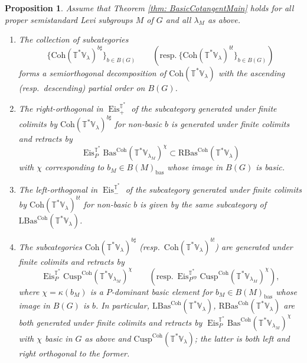 \documentclass{amsart}
\newtheorem{proposition}[theorem]{Proposition}
\theoremstyle{definition}
\theoremstyle{remark}
\numberwithin{equation}{section}
\newcommand{\bas}{\mathrm{bas}}
\newcommand{\op}{\mathrm{op}}
\DeclareMathOperator{\Eis}{\mathrm{Eis}}
\newcommand{\Coh}{\mathrm{Coh}}
\newcommand{\Cusp}{\mathrm{Cusp}}
\newcommand{\V}{\mathbb{V}}
\newcommand{\T}{\mathbb{T}}
\newcommand{\RBas}{\mathrm{RBas}}
\newcommand{\LBas}{\mathrm{LBas}}
\newcommand{\Bas}{\mathrm{Bas}}
\begin{document}
\begin{proposition}{\label{prop: refinedcotanSOD}}
Assume that Theorem \ref{thm: BasicCotangentMain} holds for all proper semistandard Levi subgroups $M$ of $G$ and all $\lambda_M$ as above.  
\begin{enumerate}
    \item The collection of subcategories 
    \[\{\Coh(\T^*\V_\lambda)^{b\sharp}\}_{b\in B(G)} \qquad  (\text{resp}.~\{\Coh(\T^*\V_\lambda)^{b!}\}_{b\in B(G)})
    \]
    forms a semiorthogonal decomposition of $\Coh(\T^*\V_\lambda)$ with the ascending (resp.~descending) partial order on $B(G)$.
    \item The right-orthogonal in $\Eis_+^{\T^*}$ of the subcategory generated under finite colimits by $\Coh(\T^*\V_\lambda)^{b\sharp}$ for non-basic $b$ is generated under finite colimits and retracts by
\[
\Eis^{\T^{\ast}}_P \Bas^\Coh(\T^*\V_{\lambda_M})^{\chi} \subset \RBas^\Coh(\T^*\V_\lambda)
\]
with $\chi$ corresponding to $b_M\in B(M)_\bas$ whose image in $B(G)$ is basic.
\item The left-orthogonal in $\Eis_-^{\T^*}$ of the subcategory generated under finite colimits by $\Coh(\T^*\V_\lambda)^{b!}$ for non-basic $b$ is given by the same subcategory of $\LBas^\Coh(\T^*\V_\lambda)$.

\item The subcategories $\Coh(\T^* \V_\lambda)^{b\sharp}$ (resp.~$\Coh(\T^* \V_\lambda)^{b!}$) are generated under finite colimits and retracts by 
\[
\Eis^{\T^{\ast}}_P \Cusp^\Coh(\T^*\V_{\lambda_M})^\chi \qquad (\text{resp}.~\Eis^{\T^{\ast}}_{P^\op} \Cusp^\Coh(\T^*\V_{\lambda_M})^\chi),
\]
where $\chi=\kappa(b_M)$ is a $P$-dominant basic element for $b_M\in B(M)_\bas$ whose image in $B(G)$ is $b$. In particular, $\LBas^\Coh(\T^{\ast}\V_\lambda)$, $\RBas^\Coh(\T^{\ast}\V_\lambda)$ are both generated under finite colimits and retracts by $\Eis_P^{\T^*} \Bas^\Coh(\T^*\V_{\lambda_M})^{\chi}$ with $\chi$ basic in $G$ as above and $\Cusp^\Coh(\T^*\V_\lambda)$; the latter is both left and right orthogonal to the former. 
\end{enumerate}
\end{proposition}
\end{document}
